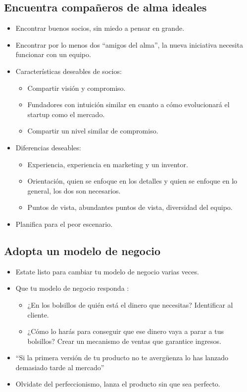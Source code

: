 \documentclass{article}
\begin{document}
\subsection{Encuentra compañeros de alma ideales}
\begin{itemize}
    \item Encontrar buenos socios, sin miedo a pensar en grande.
    \item Encontrar por lo menos dos ``amigos del alma'', la nueva iniciativa necesita funcionar con un equipo.
    \item Características deseables de socios:
        \begin{itemize}
            \item Compartir visión y compromiso.
            \item Fundadores con intuición similar en cuanto a cómo evolucionará el startup como el mercado.
            \item Compartir un nivel similar de compromiso. 
        \end{itemize}
    
    \item Diferencias deseables:
        \begin{itemize}
            \item Experiencia, experiencia en marketing y un inventor. 
            \item Orientación, quien se enfoque en los detalles y quien se enfoque en lo general, los dos son necesarios.
            \item Puntos de vista, abundantes puntos de vista, diversidad del equipo.
        \end{itemize}
    
    \item Planifica para el peor escenario.
\end{itemize}


\subsection{Adopta un modelo de negocio}
\begin{itemize}
    \item Estate listo para cambiar tu modelo de negocio varias veces.
    \item Que tu modelo de negocio responda :  
        \begin{itemize}
            \item ¿En los bolsillos de quién está el dinero que necesitas? Identificar al cliente.
            \item ¿Cómo lo harás para conseguir que ese dinero vaya a parar a tus bolsillos? Crear un mecanismo de ventas que garantice ingresos.
        \end{itemize}
    
    \item ``Si la primera versión de tu producto no te avergüenza lo has lanzado demasiado tarde al mercado''
    \item Olvidate del perfeccionismo, lanza el producto sin que sea perfecto.
\end{itemize}
\end{document}

